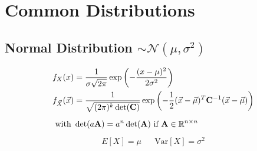 \section{Common Distributions}
\begin{mdframed}[style=eqbox]
  \subsection{Normal Distribution $\sim \mathcal{N}(\mu, \sigma^2)$}
  \vspace*{-6pt}
  \begin{align*}
    f_X(x) &= \frac{1}{\sigma \sqrt{2 \pi}} \exp\left(-\frac{(x-\mu)^2}{2 \sigma^2}\right)\\
    f_{\vec{X}}(\vec{x}) &= \frac{1}{\sqrt{(2 \pi)^k \det(\mathbf{C})}} \exp\left(-\frac{1}{2} (\vec{x}-\vec{\mu})^T \mathbf{C}^{-1} (\vec{x}-\vec{\mu})\right)\\[0.5em]
    \text{with~} &\det(a \mathbf{A}) = a^n \det(\mathbf{A}) \text{~if~} \mathbf{A} \in \mathbb{R}^{n \times n}
  \end{align*}
  \vspace*{-14pt}
  \begin{align*}
    E[X] = \mu && \text{Var}[X] = \sigma^2
  \end{align*}
\end{mdframed}

